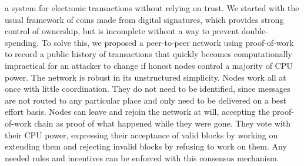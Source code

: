 \documentclass[nohyper]{tufte-handout}
\begin{document}
 a system for electronic transactions without relying on
trust. We started with the usual framework of coins made from digital
signatures, which provides strong control of ownership, but is
incomplete without a way to prevent double-spending. To solve this, we
proposed a peer-to-peer network using proof-of-work to record a public
history of transactions that quickly becomes computationally impractical
for an attacker to change if honest nodes control a majority of CPU
power. The network is robust in its unstructured simplicity. Nodes work
all at once with little coordination. They do not need to be identified,
since messages are not routed to any particular place and only need to
be delivered on a best effort basis. Nodes can leave and rejoin the
network at will, accepting the proof-of-work chain as proof of what
happened while they were gone. They vote with their CPU power,
expressing their acceptance of valid blocks by working on extending them
and rejecting invalid blocks by refusing to work on them. Any needed
rules and incentives can be enforced with this consensus mechanism.



\end{document}
